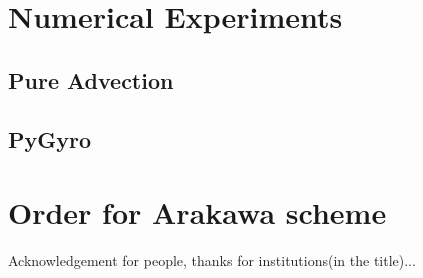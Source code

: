 \documentclass[proc]{edpsmath}
\begin{document}
\maketitle

\tableofcontents %





\section{Numerical Experiments}
	\subsection{Pure Advection}
	\subsection{PyGyro}

\appendix
\section{Order for Arakawa scheme}
\label{sec:ara_order}



\begin{acknowledgement}
Acknowledgement for people, thanks for institutions(in the title)...
\end{acknowledgement}



\end{document}
